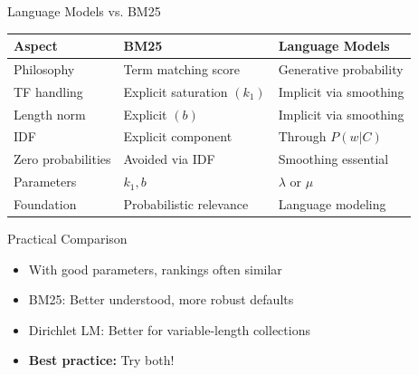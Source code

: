\documentclass[aspectratio=169]{beamer}
\begin{document}
\begin{frame}{Language Models vs. BM25}
\begin{table}
\centering
\small
\begin{tabular}{lll}
\toprule
\textbf{Aspect} & \textbf{BM25} & \textbf{Language Models} \\
\midrule
Philosophy & Term matching score & Generative probability \\
TF handling & Explicit saturation $(k_1)$ & Implicit via smoothing \\
Length norm & Explicit $(b)$ & Implicit via smoothing \\
IDF & Explicit component & Through $P(w|C)$ \\
Zero probabilities & Avoided via IDF & Smoothing essential \\
Parameters & $k_1, b$ & $\lambda$ or $\mu$ \\
Foundation & Probabilistic relevance & Language modeling \\
\bottomrule
\end{tabular}
\end{table}

\vspace{0.5em}

\begin{block}{Practical Comparison}
\begin{itemize}
    \item With good parameters, rankings often similar
    \item BM25: Better understood, more robust defaults
    \item Dirichlet LM: Better for variable-length collections
    \item \textbf{Best practice:} Try both!
\end{itemize}
\end{block}
\end{frame}
\end{document}

